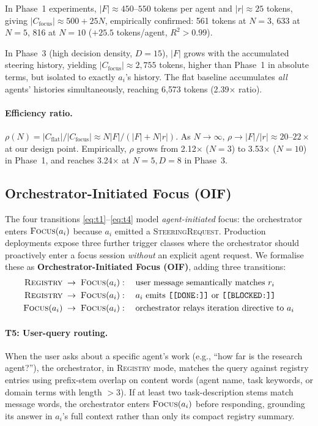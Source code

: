 \documentclass{article}
\begin{document}
In Phase~1 experiments, $|F| \approx 450$--$550$ tokens per agent and
$|r| \approx 25$ tokens, giving $|C_{\text{focus}}| \approx 500 + 25N$,
empirically confirmed: 561 tokens at $N=3$, 633 at $N=5$, 816 at $N=10$
($+25.5$ tokens/agent, $R^2 > 0.99$).

In Phase~3 (high decision density, $D=15$), $|F|$ grows with the
accumulated steering history, yielding $|C_{\text{focus}}| \approx 2{,}755$
tokens, higher than Phase~1 in absolute terms, but isolated to exactly
$a_i$'s history.
The flat baseline accumulates \emph{all} agents' histories simultaneously,
reaching 6{,}573 tokens (2.39$\times$ ratio).

\paragraph{Efficiency ratio.}
$\rho(N) = |C_{\text{flat}}| / |C_{\text{focus}}| \approx N|F| / (|F| +
N|r|)$.
As $N \to \infty$, $\rho \to |F| / |r| \approx 20$--$22\times$ at our
design point.
Empirically, $\rho$ grows from 2.12$\times$ ($N=3$) to 3.53$\times$
($N=10$) in Phase~1, and reaches 3.24$\times$ at $N=5, D=8$ in Phase~3.

\subsection{Orchestrator-Initiated Focus (OIF)}
\label{sec:oif}

The four transitions \eqref{eq:t1}--\eqref{eq:t4} model
\emph{agent-initiated} focus: the orchestrator enters
$\textsc{Focus}(a_i)$ because $a_i$ emitted a \textsc{SteeringRequest}.
Production deployments expose three further trigger classes where the
orchestrator should proactively enter a focus session \emph{without} an
explicit agent request.
We formalise these as \textbf{Orchestrator-Initiated Focus (OIF)},
adding three transitions:
\begin{align}
  \textsc{Registry} &\;\to\; \textsc{Focus}(a_i): \quad
    \text{user message semantically matches } r_i \label{eq:t5}\\
  \textsc{Registry} &\;\to\; \textsc{Focus}(a_i): \quad
    a_i \text{ emits } \texttt{[[DONE:]]} \text{ or }
    \texttt{[[BLOCKED:]]} \label{eq:t6}\\
  \textsc{Focus}(a_i) &\;\to\; \textsc{Focus}(a_i): \quad
    \text{orchestrator relays iteration directive to } a_i \label{eq:t7}
\end{align}

\paragraph{T5: User-query routing.}
When the user asks about a specific agent's work (e.g., ``how far is the
research agent?''), the orchestrator, in \textsc{Registry} mode, matches
the query against registry entries using prefix-stem overlap on content
words (agent name, task keywords, or domain terms with length $>3$).
If at least two task-description stems match message words, the orchestrator
enters $\textsc{Focus}(a_i)$ before responding, grounding its answer in
$a_i$'s full context rather than only its compact registry summary.
\end{document}
